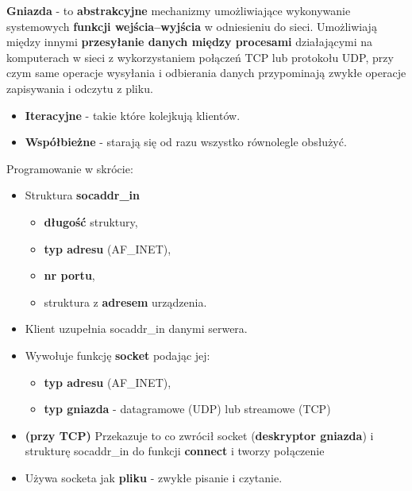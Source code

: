 \documentclass[../main.tex]{subfiles}
\begin{document}
    \textbf{Gniazda} - to \textbf{abstrakcyjne} mechanizmy umożliwiające wykonywanie systemowych
    \textbf{funkcji wejścia–wyjścia} w odniesieniu do sieci. Umożliwiają między innymi
    \textbf{przesyłanie danych między procesami} działającymi na komputerach w sieci z wykorzystaniem
    połączeń TCP lub protokołu UDP, przy czym same operacje wysyłania i odbierania danych
    przypominają zwykłe operacje zapisywania i odczytu z pliku.


    \begin{itemize}
        \item \textbf{Iteracyjne} - takie które kolejkują klientów.
        \item \textbf{Współbieżne} - starają się od razu wszystko równolegle obsłużyć.
    \end{itemize}

    Programowanie w skrócie:
    \begin{itemize}
        \item Struktura \textbf{socaddr\_in}
        \begin{itemize}
            \item \textbf{długość} struktury,
            \item \textbf{typ adresu} (AF\_INET),
            \item \textbf{nr portu},
            \item struktura z \textbf{adresem} urządzenia.
        \end{itemize}
        \item Klient uzupełnia socaddr\_in danymi serwera.
        \item Wywołuje funkcję \textbf{socket} podając jej:
        \begin{itemize}
            \item \textbf{typ adresu} (AF\_INET),
            \item \textbf{typ gniazda} - datagramowe (UDP) lub streamowe (TCP)
        \end{itemize}
        \item \textbf{(przy TCP)} Przekazuje to co zwrócił socket (\textbf{deskryptor gniazda}) i strukturę socaddr\_in do funkcji \textbf{connect} i tworzy połączenie
        \item Używa socketa jak \textbf{pliku} - zwykłe pisanie i czytanie.
    \end{itemize}
\end{document}
